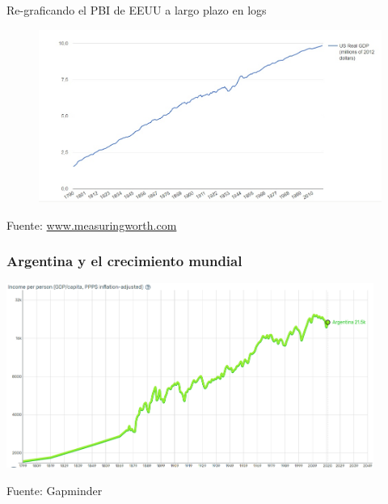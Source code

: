 \documentclass{beamer}
\begin{document}
\begin{frame}{Re-graficando el PBI de EEUU a largo plazo en logs}
   \begin{figure} [H]   \includegraphics[scale=0.45]{Figures/C16.4.jpg}
\end{figure}
Fuente: \href{https://www.measuringworth.com/graphs/}{www.measuringworth.com}
\end{frame}

\begin{frame}
\frametitle{Argentina y el crecimiento mundial}
\begin{center}
\href{https://www.gapminder.org/tools/#$model$markers$line$data$filter$dimensions$country$country$/$in@=usa&=chn&=arg&=bra&=nzl&=can&=aus;;;;;;&encoding$selected$data$filter$markers@=aus&=arg;;;;;;;;&chart-type=linechart&url=v1} {\includegraphics[width=0.9\textwidth]{Figures/gdparg.png}}
\end{center}
Fuente: Gapminder
\end{frame}
\end{document}
